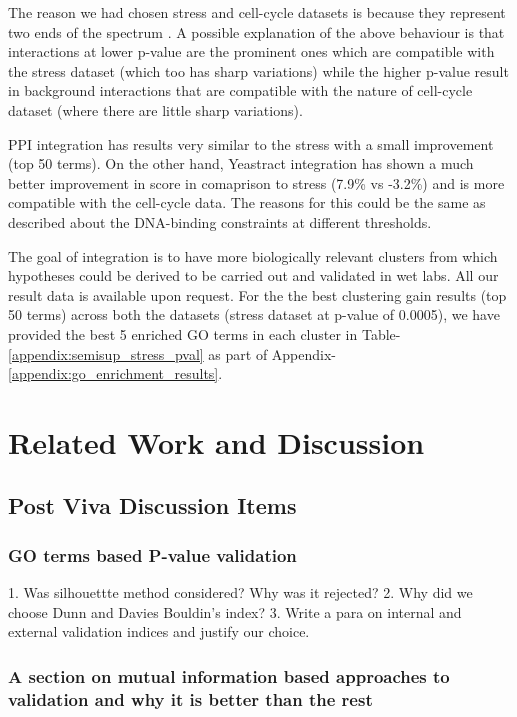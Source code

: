The reason we had chosen stress and cell-cycle datasets is because they represent two ends of the spectrum \citep{amos05integrative}. A possible explanation of 
the above behaviour is that interactions at lower p-value are the prominent ones which are compatible with the stress dataset (which too has sharp variations) while the 
higher p-value result in background interactions that are compatible with the nature of cell-cycle dataset (where there are little sharp variations).

PPI integration has results very similar to the stress with a small improvement (top 50 terms). On the other  hand, Yeastract integration has shown a much better 
improvement in score in comaprison to stress (7.9\% vs -3.2\%) and is more compatible with the cell-cycle data. The reasons for this could be the same as described 
about the DNA-binding constraints at different thresholds. 

The goal of integration is to have more biologically relevant clusters from which hypotheses could be derived to be carried out and validated in wet labs. 
All our result data is available upon request. For the the best clustering gain results (top 50 terms) across both the datasets (stress dataset at p-value of 0.0005), 
we have provided the best 5 enriched GO terms in each cluster in Table-\ref{appendix:semisup_stress_pval} as part of Appendix-\ref{appendix:go_enrichment_results}. 

\section{Related Work and Discussion}
\subsection{Post Viva Discussion Items}
\subsubsection{GO terms based P-value validation}
1. Was silhouettte method considered? Why was it rejected?
2. Why did we choose Dunn and Davies Bouldin's index?
3. Write a para on internal and external validation indices and justify our choice.

\subsubsection{A section on mutual information based approaches to validation and why it is better than the rest}

